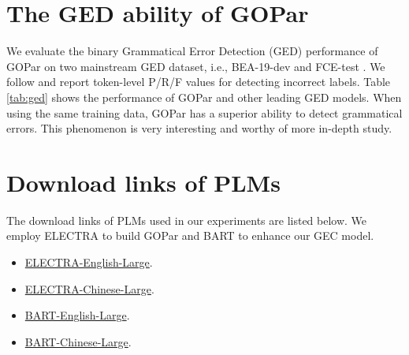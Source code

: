 \documentclass[11pt]{article}
\begin{document}
\section{The GED ability of GOPar}
\label{sec:appendix:ged}
We evaluate the binary Grammatical Error Detection (GED) performance of GOPar on two mainstream GED dataset, i.e., BEA-19-dev \citep{bryant2019bea} and FCE-test \citep{yannakoudakis2011new}. We follow \citet{rei-yannakoudakis-2016-compositional} and report token-level P/R/F values for detecting incorrect labels. 
Table \ref{tab:ged} shows the performance of GOPar and other leading GED models. 
When using the same training data, GOPar has a superior ability to detect grammatical errors. This phenomenon is very interesting and worthy of more in-depth study.
\begin{table}[h!]
\caption{Binary GED performance.}
\label{tab:ged}
\end{table}

 
\section{Download links of PLMs}
The download links of PLMs used in our experiments are listed below. We employ ELECTRA \citep{DBLP:conf/iclr/ClarkLLM20, cui2020revisiting} to build GOPar and BART \citep{lewis2020bart, shao2021cpt} to enhance our GEC model.
\begin{sloppypar}
 \begin{itemize}
     \item \href{https://huggingface.co/google/electra-large-discriminator}{ELECTRA-English-Large}.
     \item \href{https://huggingface.co/hfl/chinese-electra-180g-large-discriminator}{ELECTRA-Chinese-Large}.
     \item \href{https://huggingface.co/facebook/bart-large}{BART-English-Large}.
     \item \href{https://huggingface.co/fnlp/bart-large-chinese}{BART-Chinese-Large}.
 \end{itemize}
\end{sloppypar}

\label{sec:appendix:download}




 
\end{document}
